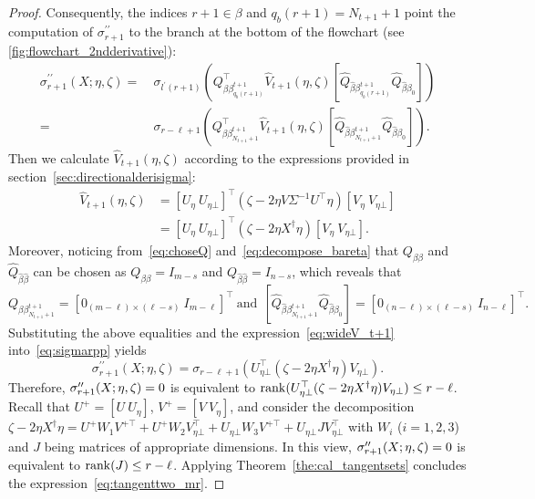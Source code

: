 \begin{proof}
    Consequently, the indices $r+1\in\beta$ and $q_b(r+1)=N_{t+1}+1$ point the computation of $\sigma_{r+1}^{\prime\prime}$ to the branch at the bottom of the flowchart (see \myfig\ref{fig:flowchart_2ndderivative}):
    \begin{align}        
        \sigma_{r+1}^{\prime \prime}(X;\eta,\zeta)=&\ \sigma_{l^{\prime}(r+1)}(Q_{\beta \beta_{q_b(r+1)}^{t+1}}^\top \widehat{V}_{t+1}(\eta,\zeta)[\widehat{Q}_{\widehat{\beta} \beta_{q_b(r+1)}^{t+1}} \widehat{Q}_{\widehat{\beta}\beta_0}])    \nonumber
        \\
        =&\ \sigma_{r-\ell+1}(Q_{\beta \beta_{N_{t+1}+1}^{t+1}}^\top \widehat{V}_{t+1}(\eta,\zeta)[\widehat{Q}_{\widehat{\beta} \beta_{N_{t+1}+1}^{t+1}} \widehat{Q}_{\widehat{\beta}\beta_0}]).   \label{eq:sigmarpp}
    \end{align}
    Then we calculate $\widehat{V}_{t+1}(\eta,\zeta)$ according to the expressions provided in section~\ref{sec:directionalderisigma}:
    \begin{align}
        \widehat{V}_{t+1}(\eta,\zeta)&=[U_\eta\ U_{\eta\bot}]^\top(\zeta-2\eta V\varSigma^{-1}U^\top\eta)[V_\eta\ V_{\eta\bot}]     \nonumber
        \\
        &=[U_\eta\ U_{\eta\bot}]^\top(\zeta-2\eta X^\dagger\eta)[V_\eta\ V_{\eta\bot}].     \label{eq:wideV_t+1}
    \end{align}
    Moreover, noticing from~\eqref{eq:choseQ} and~\eqref{eq:decompose_bareta} that $Q_{\beta\beta}$ and $\widehat{Q}_{\widehat{\beta}\widehat{\beta}}$ can be chosen as $Q_{\beta\beta}=I_{m-s}$ and $Q_{\widehat{\beta}\widehat{\beta}}=I_{n-s}$, which reveals that 
    $$Q_{\beta \beta_{N_{t+1}+1}^{t+1}}=[0_{(m-\ell)\times(\ell-s)}\ I_{m-\ell}]^\top\ \text{and}\ \ [\widehat{Q}_{\widehat{\beta} \beta_{N_{t+1}+1}^{t+1}} \widehat{Q}_{\widehat{\beta}\beta_0}]=[0_{(n-\ell)\times(\ell-s)}\ I_{n-\ell}]^\top.$$
    Substituting the above equalities and the expression~\eqref{eq:wideV_t+1} into~\eqref{eq:sigmarpp} yields
    \begin{equation*}
        \sigma_{r+1}^{\prime \prime}(X;\eta,\zeta) = \sigma_{r-\ell+1}(U_{\eta\bot}^\top(\zeta-2\eta X^\dagger\eta)V_{\eta\bot}). 
    \end{equation*}
    Therefore, $\sigma_{r+1}^{\prime\prime}(X;\eta,\zeta)=0$ is equivalent to $\operatorname{rank}(U_{\eta\bot}^\top(\zeta-2\eta X^\dagger\eta)V_{\eta\bot})\le r-\ell$. Recall that $U^+=[U\ U_{\eta}]$, $V^+=[V\ V_{\eta}]$, and consider the decomposition $\zeta-2\eta X^\dagger\eta=U^+W_1V^{+\top}+U^+W_2V_{\eta\bot}^\top+U_{\eta\bot}W_3V^{+\top}+U_{\eta\bot}JV_{\eta\bot}^\top$ with $W_i$ ($i=1,2,3$) and $J$ being matrices of appropriate dimensions. In this view, $\sigma_{r+1}^{\prime\prime}(X;\eta,\zeta)=0$ is equivalent to $\operatorname{rank}(J)\le r-\ell$. Applying Theorem~\ref{the:cal_tangentsets} concludes the expression~\eqref{eq:tangenttwo_mr}.
\end{proof}

